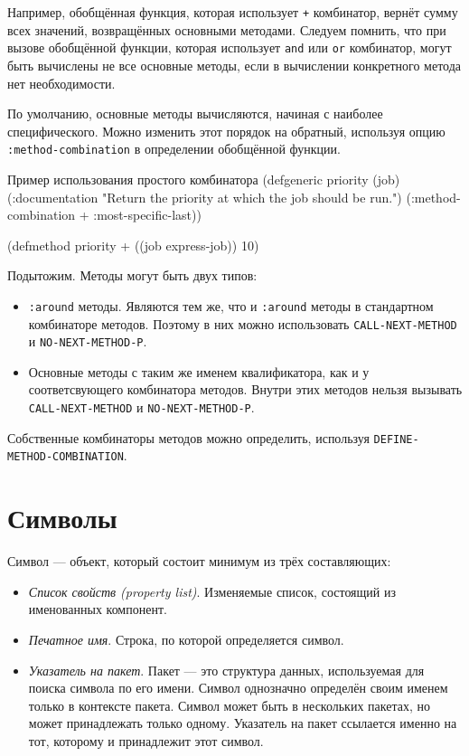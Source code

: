 Например, обобщённая функция, которая использует \lstinline{+} комбинатор, вернёт сумму всех значений, возвращённых основными методами. Следуем помнить, что при вызове обобщённой функции, которая использует \lstinline{and} или \lstinline{or} комбинатор, могут быть вычислены не все основные методы, если в вычислении конкретного метода нет необходимости.

По умолчанию, основные методы вычисляются, начиная с наиболее специфического. Можно изменить этот порядок на обратный, используя опцию \lstinline{:method-combination} в определении обобщённой функции.

\begin{cllst}{Пример использования простого комбинатора}{}
(defgeneric priority (job)
  (:documentation "Return the priority at which the job should be run.")
  (:method-combination + :most-specific-last))

(defmethod priority + ((job express-job)) 10)
\end{cllst}

Подытожим. Методы могут быть двух типов:
\begin{itemize}
  \item \lstinline{:around} методы. Являются тем же, что и \lstinline{:around} методы в стандартном комбинаторе методов. Поэтому в них можно использовать \lstinline{CALL-NEXT-METHOD} и \lstinline{NO-NEXT-METHOD-P}.
  \item Основные методы с таким же именем квалификатора, как и у соответсвующего комбинатора методов. Внутри этих методов нельзя вызывать \lstinline{CALL-NEXT-METHOD} и \lstinline{NO-NEXT-METHOD-P}.
\end{itemize}

Собственные комбинаторы методов можно определить, используя \lstinline{DEFINE-METHOD-COMBINATION}.

\section{Символы}
Символ — объект, который состоит минимум из трёх составляющих:
\begin{itemize}
  \item \emph{Список свойств (property list)}. Изменяемые список, состоящий из именованных компонент.
  \item \emph{Печатное имя}. Строка, по которой определяется символ.
  \item \emph{Указатель на пакет}. Пакет — это структура данных, используемая для поиска символа по его имени. Символ однозначно определён своим именем только в контексте пакета. Символ может быть в нескольких пакетах, но может принадлежать только одному. Указатель на пакет ссылается именно на тот, которому и принадлежит этот символ.
\end{itemize}

